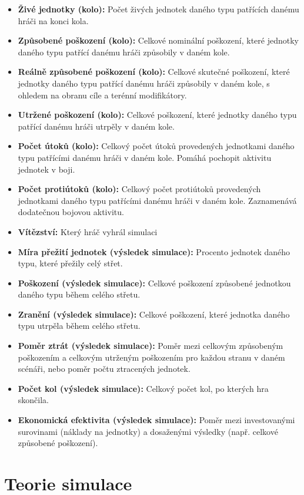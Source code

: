 \begin{itemize}
    \item \textbf{Živé jednotky (kolo):} Počet živých jednotek daného typu patřících danému hráči na konci kola.
    \item \textbf{Způsobené poškození (kolo):} Celkové nominální poškození, které jednotky daného typu patřící danému hráči způsobily v daném kole.
    \item \textbf{Reálně způsobené poškození (kolo):} Celkové skutečné poškození, které jednotky daného typu patřící danému hráči způsobily v daném kole, s ohledem na obranu cíle a terénní modifikátory.
    \item \textbf{Utržené poškození (kolo):} Celkové poškození, které jednotky daného typu patřící danému hráči utrpěly v daném kole.
    \item \textbf{Počet útoků (kolo):} Celkový počet útoků provedených jednotkami daného typu patřícími danému hráči v daném kole. Pomáhá pochopit aktivitu jednotek v boji.
    \item \textbf{Počet protiútoků (kolo):} Celkový počet protiútoků provedených jednotkami daného typu patřícími danému hráči v daném kole. Zaznamenává dodatečnou bojovou aktivitu.
    \item \textbf{Vítězství:} Který hráč vyhrál simulaci
    \item \textbf{Míra přežití jednotek (výsledek simulace):} Procento jednotek daného typu, které přežily celý střet.
    \item \textbf{Poškození (výsledek simulace):} Celkové poškození způsobené jednotkou daného typu během celého střetu.
    \item \textbf{Zranění (výsledek simulace):} Celkové poškození, které jednotka daného typu utrpěla během celého střetu.
    \item \textbf{Poměr ztrát (výsledek simulace):} Poměr mezi celkovým způsobeným poškozením a celkovým utrženým poškozením pro každou stranu v daném scénáři, nebo poměr počtu ztracených jednotek.
    \item \textbf{Počet kol (výsledek simulace):} Celkový počet kol, po kterých hra skončila.
    \item \textbf{Ekonomická efektivita (výsledek simulace):} Poměr mezi investovanými surovinami (náklady na jednotky) a dosaženými výsledky (např. celkové způsobené poškození).
\end{itemize}

\section{Teorie simulace}


